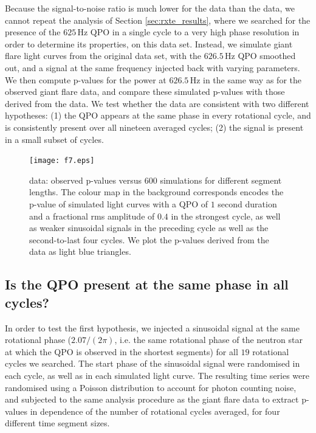 \documentclass{emulateapj}
\begin{document}
Because the signal-to-noise ratio is much lower for the \rhessi data than the \rxte data, we cannot repeat the analysis of Section \ref{sec:rxte_results}, where we searched for the presence of the $625 \, \mathrm{Hz}$ QPO in a single cycle to a very high phase resolution in order to determine its properties, on this data set. Instead, we simulate giant flare light curves from the original data set, with the $626.5 \, \mathrm{Hz}$ QPO smoothed out, and a signal at the same frequency injected back with varying parameters. We then compute p-values for the power at $626.5 \, \mathrm{Hz}$ in the same way as for the observed giant flare data, and compare these simulated p-values with those derived from the data. We test whether the data are consistent with two different hypotheses: (1) the QPO appears at the same phase in every rotational cycle, and is consistently present over all nineteen averaged cycles; (2) the signal is present in a small subset of cycles.

 \begin{figure}[htbp]
\begin{center}
\texttt{[image: f7.eps]}
\caption{\rhessi data: observed p-values versus $600$ simulations for different segment lengths. The colour map in the background corresponds encodes the p-value of simulated light curves with a QPO of $1$ second duration and a fractional rms amplitude of $0.4$ in the strongest cycle, as well as weaker sinusoidal signals in the preceding cycle as well as the second-to-last four cycles. We plot the p-values derived from the \rhessi data as light blue triangles.}
\label{fig:rhessi_sims3_pvalues}
\end{center}
\end{figure}

\subsection{Is the QPO present at the same phase in all cycles?}

In order to test the first hypothesis, we injected a sinusoidal signal at the same rotational phase ($2.07/(2\pi)$, i.e. the same rotational phase of the neutron star at which the QPO is observed in the shortest segments) for all $19$ rotational cycles we searched. The start phase of the sinusoidal signal were randomised in each cycle, as well as in each simulated light curve. The resulting time series were randomised using a Poisson distribution to account for photon counting noise, and subjected to the same analysis procedure as the giant flare data to extract p-values in dependence of the number of rotational cycles averaged, for four different time segment sizes.
\end{document}
